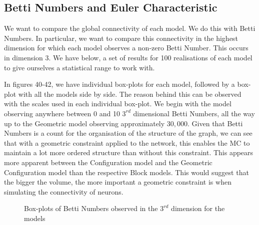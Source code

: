 \subsection{Betti Numbers and Euler Characteristic}
We want to compare the global connectivity of each model. We do this with Betti Numbers. In particular, we want to compare this connectivity in the highest dimension for which each model observes a non-zero Betti Number. This occurs in dimension 3. We have below, a set of results for 100 realisations of each model to give ourselves a statistical range to work with.

In figures 40-42, we have individual box-plots for each model, followed by a box-plot with all the models side by side. The reason behind this can be observed with the scales used in each individual box-plot. We begin with the \ER model observing anywhere between 0 and 10 $3^{rd}$ dimensional Betti Numbers, all the way up to the Geometric model observing approximately $30,000$. Given that Betti Numbers is a count for the organisation of the structure of the graph, we can see that with a geometric constraint applied to the network, this enables the MC to maintain a lot more ordered structure than without this constraint. This appears more apparent between the Configuration model and the Geometric Configuration model than the respective Block models. This would suggest that the bigger the volume, the more important a geometric constraint is when simulating the connectivity of neurons.

\begin{figure}[H]%
    \centering
    \captionsetup{justification=centering}
    \qquad
    \caption{Box-plots of Betti Numbers observed in the $3^{rd}$ dimension for the models}%
    \label{fig:example}%
\end{figure}

